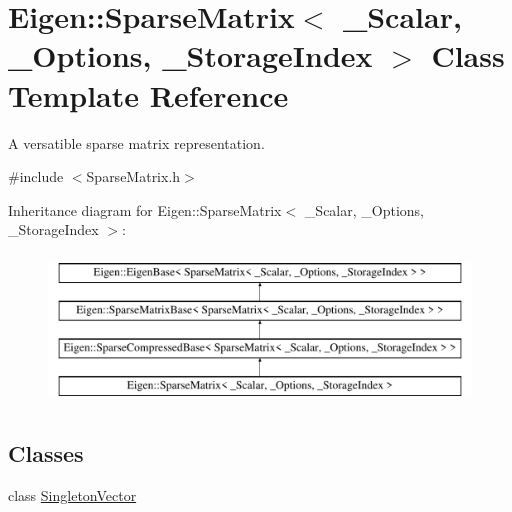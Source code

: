\hypertarget{class_eigen_1_1_sparse_matrix}{}\section{Eigen\+::Sparse\+Matrix$<$ \+\_\+\+Scalar, \+\_\+\+Options, \+\_\+\+Storage\+Index $>$ Class Template Reference}
\label{class_eigen_1_1_sparse_matrix}


A versatible sparse matrix representation.  




{\ttfamily \#include $<$Sparse\+Matrix.\+h$>$}

Inheritance diagram for Eigen\+::Sparse\+Matrix$<$ \+\_\+\+Scalar, \+\_\+\+Options, \+\_\+\+Storage\+Index $>$\+:\begin{figure}[H]
\begin{center}
\leavevmode
\includegraphics[height=4.000000cm]{class_eigen_1_1_sparse_matrix}
\end{center}
\end{figure}
\subsection*{Classes}
\begin{DoxyCompactItemize}
\item 
class \mbox{\hyperlink{class_eigen_1_1_sparse_matrix_1_1_singleton_vector}{Singleton\+Vector}}
\end{DoxyCompactItemize}
